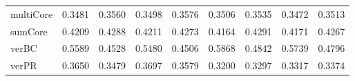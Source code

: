 \begin{table}[!htbp]
\begin{tabular}{lrrrrrrrr}
          multiCore  &   {\num{ 0.3481}} &   {\num{ 0.3560}} &   {\num{ 0.3498}} &   {\num{ 0.3576}} &   {\num{ 0.3506}} &   {\num{ 0.3535}} &   {\num{ 0.3472}} &   {\num{ 0.3513}} \\
            sumCore  &   {\num{ 0.4209}} &   {\num{ 0.4288}} &   {\num{ 0.4211}} &   {\num{ 0.4273}} &   {\num{ 0.4164}} &   {\num{ 0.4291}} &   {\num{ 0.4171}} &   {\num{ 0.4267}} \\
              verBC  &   {\num{ 0.5589}} &   {\num{ 0.4528}} &   {\num{ 0.5480}} &   {\num{ 0.4506}} &   {\num{ 0.5868}} &   {\num{ 0.4842}} &   {\num{ 0.5739}} &   {\num{ 0.4796}} \\
              verPR  &   {\num{ 0.3650}} &   {\num{ 0.3479}} &   {\num{ 0.3697}} &   {\num{ 0.3579}} &   {\num{ 0.3200}} &   {\num{ 0.3297}} &   {\num{ 0.3317}} &   {\num{ 0.3374}} \\
        \bottomrule

    \end{tabular}
\end{table}


